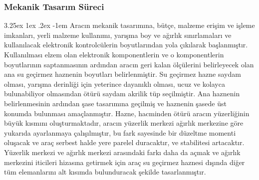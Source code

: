 \documentclass[12pt]{article}
\makeatletter
\renewcommand\paragraph{\@startsection{paragraph}{5}{\z@}%
  {3.25ex \@plus1ex \@minus.2ex}%
  {-1em}%
  {\normalfont\normalsize\bfseries}}
\makeatother
\begin{document}
\subsubsection{Mekanik Tasarım Süreci}

\paragraph{} Aracın mekanik tasarımına, bütçe, malzeme erişim  ve işleme imkanları, yerli malzeme kullanımı, yarışma boy ve ağırlık sınırlamaları ve kullanılacak elektronik kontrolcülerin boyutlarından yola çıkılarak başlanmıştır. Kullanılması elzem olan elektronik komponentlerin ve o komponentlerin boyutlarının saptanmasının ardından aracın geri kalan ölçülerini belirleyecek olan ana su geçirmez haznenin boyutları belirlenmiştir. Su geçirmez hazne saydam olması, yarışma derinliği için yeterince dayanıklı olması, ucuz ve kolayca bulunabiliyor olmasından ötürü saydam akrilik tüp seçilmiştir. Ana haznenin belirlenmesinin ardından şase tasarımına geçilmiş ve haznenin şasede üst konumda bulunması amaçlanmıştır. Hazne, hacminden ötürü aracın yüzerliğinin büyük kısmını oluşturmaktadır, aracın yüzerlik merkezi ağırlık merkezine göre yukarıda ayarlanmaya çalışılmıştır, bu fark sayesinde bir düzeltme momenti oluşacak ve araç serbest halde yere parelel duracaktır, ve stabilitesi artacaktır.\cite{BOOK:rovmanual} Yüzerlik merkezi ve ağırlık merkezi arasındaki farkı daha da açmak ve ağırlık merkezini iticileri hizasına getirmek için araç su geçirmez haznesi dışında diğer tüm elemanlarını alt kısımda bulunduracak şekilde tasarlanmıştır.
\end{document}
